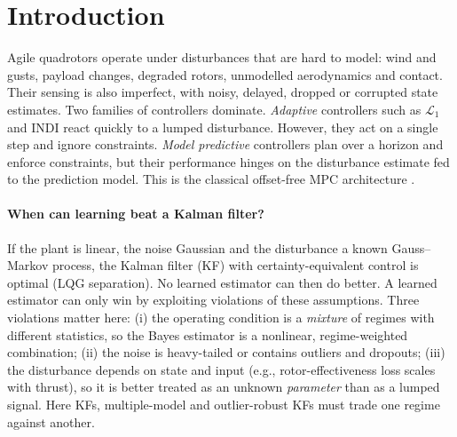 \section{Introduction}
\label{sec:intro}

Agile quadrotors operate under disturbances that are hard to model: wind and gusts, payload changes, degraded rotors, unmodelled aerodynamics and contact. Their sensing is also imperfect, with noisy, delayed, dropped or corrupted state estimates.
Two families of controllers dominate. \emph{Adaptive} controllers such as $\mathcal{L}_1$ \citep{hovakimyan2010l1,wu2023l1quad} and INDI \citep{smeur2016adaptive,tal2021accurate} react quickly to a lumped disturbance. However, they act on a single step and ignore constraints. \emph{Model predictive} controllers \citep{sun2022comparative,hanover2022performance,torrente2021data,salzmann2023neuralmpc} plan over a horizon and enforce constraints, but their performance hinges on the disturbance estimate fed to the prediction model. This is the classical offset-free MPC architecture \citep{pannocchia2003disturbance,maeder2009linear}.

\paragraph{When can learning beat a Kalman filter?}
If the plant is linear, the noise Gaussian and the disturbance a known Gauss--Markov process, the Kalman filter (KF) with certainty-equivalent control is optimal (LQG separation). No learned estimator can then do better.
A learned estimator can only win by exploiting violations of these assumptions. Three violations matter here: (i) the operating condition is a \emph{mixture} of regimes with different statistics, so the Bayes estimator is a nonlinear, regime-weighted combination; (ii) the noise is heavy-tailed or contains outliers and dropouts; (iii) the disturbance depends on state and input (e.g., rotor-effectiveness loss scales with thrust), so it is better treated as an unknown \emph{parameter} than as a lumped signal. Here KFs, multiple-model \citep{magill1965optimal,blom1988imm} and outlier-robust KFs \citep{ting2007kalman} must trade one regime against another.

